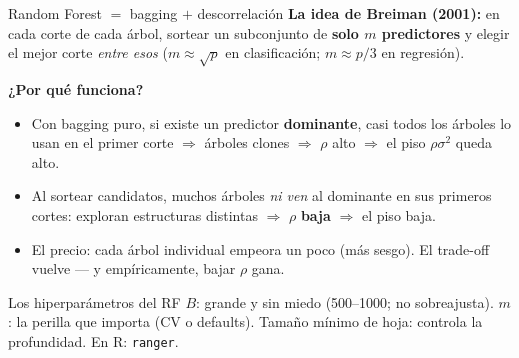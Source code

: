 \documentclass{beamer}
\newcommand{\1}{\mathbb{I}}
\begin{document}
\begin{frame}{Random Forest $=$ bagging $+$ descorrelación}
\small
\textbf{La idea de Breiman (2001):} en cada corte de cada árbol, sortear un subconjunto de \textbf{solo $m$ predictores} y elegir el mejor corte \emph{entre esos} ($m \approx \sqrt{p}$ en clasificación; $m \approx p/3$ en regresión).
\pause

\vspace{0.2cm}
\textbf{¿Por qué funciona?}
\begin{itemize}\itemsep5pt
  \item Con bagging puro, si existe un predictor \textbf{dominante}, casi todos los árboles lo usan en el primer corte $\Rightarrow$ árboles clones $\Rightarrow$ $\rho$ alto $\Rightarrow$ el piso $\rho\sigma^2$ queda alto. \pause
  \item Al sortear candidatos, muchos árboles \emph{ni ven} al dominante en sus primeros cortes: exploran estructuras distintas $\Rightarrow$ $\rho$ \textbf{baja} $\Rightarrow$ el piso baja.
  \item El precio: cada árbol individual empeora un poco (más sesgo). El trade-off vuelve --- y empíricamente, bajar $\rho$ gana. \pause
\end{itemize}

\vspace{0.1cm}
\begin{block}{Los hiperparámetros del RF}
$B$: grande y sin miedo (500--1000; no sobreajusta). $m$: la perilla que importa (CV o defaults). Tamaño mínimo de hoja: controla la profundidad. En R: \texttt{ranger}.
\end{block}
\end{frame}
\end{document}
